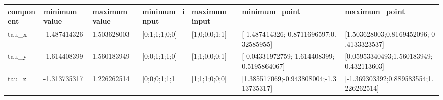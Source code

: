 \begin{tabular}{@{}lllllll@{}}
\toprule
component & minimum\_value & maximum\_value & minimum\_input & maximum\_input & minimum\_point & maximum\_point \\
\midrule
tau\_x & -1.487414326 & 1.503628003 & [0;1;1;1;0;0] & [1;0;0;0;1;1] & [-1.487414326;-0.8711696597;0.32585955] & [1.503628003;0.8169452096;-0.4133323537] \\
tau\_y & -1.614408399 & 1.560183949 & [0;0;1;1;1;0] & [1;1;0;0;0;1] & [-0.04331972759;-1.614408399;-0.5195864067] & [0.05953340493;1.560183949;0.432113603] \\
tau\_z & -1.313735317 & 1.226262514 & [0;0;0;1;1;1] & [1;1;1;0;0;0] & [1.385517069;-0.943808004;-1.313735317] & [-1.369303392;0.889583554;1.226262514] \\
\bottomrule
\end{tabular}

